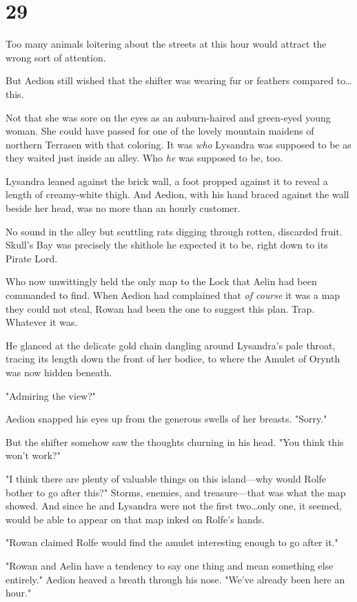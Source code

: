 
\chapter{29}

Too many animals loitering about the streets at this hour would attract the wrong sort of attention.

But Aedion still wished that the shifter was wearing fur or feathers compared to\ldots this.

Not that she was sore on the eyes as an auburn-haired and green-eyed young woman.
She could have passed for one of the lovely mountain maidens of northern Terrasen with that coloring.
It was \emph{who}
Lysandra was supposed to be as they waited just inside an alley.
Who \emph{he} was supposed to be, too.

Lysandra leaned against the brick wall, a foot propped against it to reveal a length of creamy-white thigh.
And Aedion, with his hand braced against the wall beside her head, was no more than an hourly customer.

No sound in the alley but scuttling rats digging through rotten, discarded fruit.
Skull's Bay was precisely the shithole he expected it to be, right down to its Pirate Lord.

Who now unwittingly held the only map to the Lock that Aelin had been commanded to find.
When Aedion had complained that \emph{of course} it was a map they could not steal, Rowan had been the one to suggest this  plan.
Trap.
Whatever it was.

He glanced at the delicate gold chain dangling around Lysandra's pale throat, tracing its length down the front of her bodice, to where the Amulet of Orynth was now hidden beneath.

"Admiring the view?"

Aedion snapped his eyes up from the generous swells of her breasts.
"Sorry."

But the shifter somehow saw the thoughts churning in his head.
"You think this won't work?"

"I think there are plenty of valuable things on this island---why would Rolfe bother to go after this?"
Storms, enemies, and treasure---that was what the map showed.
And since he and Lysandra were not the first two\ldots only one, it seemed, would be able to appear on that map inked on Rolfe's hands.

"Rowan claimed Rolfe would find the amulet interesting enough to go after it."

"Rowan and Aelin have a tendency to say one thing and mean something else entirely."
Aedion heaved a breath through his nose.
"We've already been here an hour."

